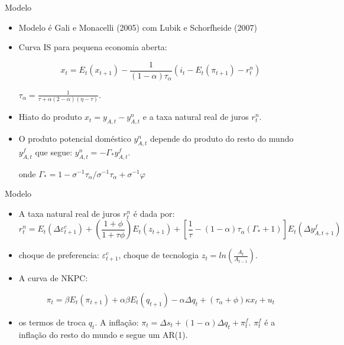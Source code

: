 \documentclass[9pt]{beamer}
\let\olditem\item
\renewcommand{\item}{%
\olditem\vspace{\fill}}
\begin{document}
\begin{frame}{Modelo}
\begin{itemize}

\item Modelo é Gali e Monacelli (2005) com Lubik e Schorfheide (2007) 

\item Curva IS para pequena economia aberta:

\begin{equation*}
    x_t = E_t(x_{t+1}) - \frac{1}{(1-\alpha)\tau_{\alpha}}\left(i_t - E_t(\pi_{t+1}) - r_t^{n} \right)
\end{equation*}

$\tau_{\alpha} = \frac{1}{\tau + \alpha(2 - \alpha)(\eta - \tau)}$.

\item Hiato do produto $x_t = y_{A,t} - y_{A,t}^{n}$ e a taxa natural real de juros $r_t^{n}$.

\item O produto potencial doméstico $y_{A,t}^{n}$ depende do produto do resto do mundo $y_{A,t}^{f}$ que segue: $y_{A,t}^{n} = - \Gamma_{*}y_{A,t}^{f} $.

onde $\Gamma_{*}=1-\sigma^{-1} \tau_{\alpha} / \sigma^{-1} \tau_{\alpha}+\sigma^{-1} \varphi$


\end{itemize}
\end{frame}
\begin{frame}{Modelo}
\begin{itemize}
\item A taxa natural real de juros $r_t^{n}$ é dada por:
\begin{equation*}
    r_t^{n} = E_t(\Delta \varepsilon_{t+1}^{c}) + \left( \frac{1 + \phi}{1 + \tau \phi} \right)E_t(z_{t+1}) + \left[\frac{1}{\tau} -(1 - \alpha)\tau_{\alpha}(\Gamma_{*}+1)   \right]E_t(\Delta y_{A,t+1}^{f})
\end{equation*}

\item choque de preferencia: $\varepsilon_{t+1}^{c}$, choque de tecnologia $z_t = ln\left( \frac{A_t}{A_{t-1}} \right)$.

\item A curva de NKPC:

\begin{equation*}
    \pi_t = \beta E_t(\pi_{t+1} ) + \alpha \beta E_t(q_{t+1}) - \alpha \Delta q_t + (\tau_{\alpha} + \phi) \kappa x_t + u_t
\end{equation*}

\item os termos de troca $q_t$. A inflação: $\pi_t = \Delta s_t + (1 - \alpha) \Delta q_t + \pi_t^{f} $. $\pi_t^{f}$ é a inflação do resto do mundo e segue um AR(1). 


\end{itemize}
\end{frame}
\end{document}
